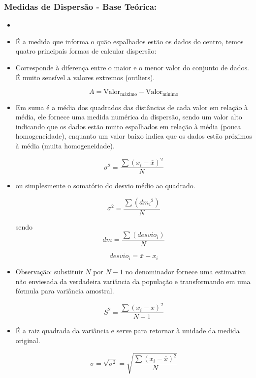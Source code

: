 \documentclass[a4paper,11pt]{article}
\begin{document}
\subsubsection*{Medidas de Dispersão - Base Teórica:} 
\begin{itemize}
\item[]

    \item É a medida que informa o quão espalhados estão os dados do centro, temos quatro principais formas de calcular dispersão:

    \item Corresponde à diferença entre o maior e o menor valor do conjunto de dados. É muito sensível a valores extremos (outliers).

     \[ A = \text{Valor}_{\text{máximo}} -\text{Valor}_{\text{mínimo}} \]
    
    \item Em suma é a média dos quadrados das distâncias de cada valor em relação à média, ele fornece uma medida numérica da dispersão, sendo um valor alto indicando que os dados estão muito espalhados em relação à média (pouca homogeneidade), enquanto um valor baixo indica que os dados estão próximos à média (muita homogeneidade). 

    \[\sigma^2 = \frac{\sum (x_i - \overline{x})^2}{N}\]

    \item ou simplesmente o somatório do desvio médio ao quadrado.

    \[\sigma^2 = \frac{\sum (dm_i{^2})}{N}\]

    sendo 
    \[dm = \frac{\sum (desvio_i)}{N}\] 

    \[desvio_i = \overline{x} - x_i\]

    \item Observação: substituir $N$ por $N-1$ no denominador fornece uma estimativa não enviesada da verdadeira variância da população e transformando em uma fórmula para variância amostral.

    \[S^2 = \frac{\sum (x_i - \overline{x})^2}{N-1}\]

    \item É a raiz quadrada da variância e serve para retornar à unidade da medida original. 

    \[\sigma = \sqrt {\sigma^2} = \sqrt{\frac{\sum (x_i - \overline{x})^2}{N}}\]


\end{itemize}
\end{document}
